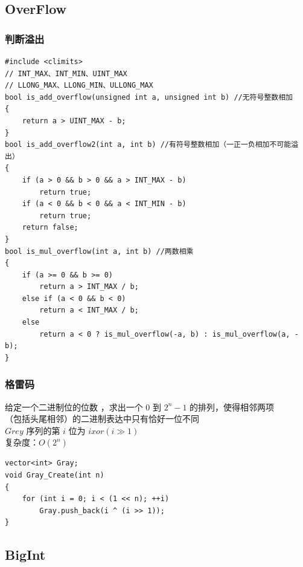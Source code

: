 \documentclass[twoside]{article}
\begin{document}
\subsection{OverFlow}
\subsubsection{判断溢出}
\begin{lstlisting}
#include <climits>
// INT_MAX、INT_MIN、UINT_MAX
// LLONG_MAX、LLONG_MIN、ULLONG_MAX
bool is_add_overflow(unsigned int a, unsigned int b) //无符号整数相加
{
    return a > UINT_MAX - b;
}
bool is_add_overflow2(int a, int b) //有符号整数相加（一正一负相加不可能溢出）
{
    if (a > 0 && b > 0 && a > INT_MAX - b)
        return true;
    if (a < 0 && b < 0 && a < INT_MIN - b)
        return true;
    return false;
}
bool is_mul_overflow(int a, int b) //两数相乘
{
    if (a >= 0 && b >= 0)
        return a > INT_MAX / b;
    else if (a < 0 && b < 0)
        return a < INT_MAX / b;
    else
        return a < 0 ? is_mul_overflow(-a, b) : is_mul_overflow(a, -b);
}
\end{lstlisting}
\subsubsection{格雷码}
给定一个二进制位的位数 ，求出一个 $0$ 到 $2^n - 1$ 的排列，使得相邻两项 \\
（包括头尾相邻）的二进制表达中只有恰好一位不同 \\
$Grey$ 序列的第 $i$ 位为 $i xor (i \gg 1)$ \\
复杂度：$O(2^n)$
\begin{lstlisting}
vector<int> Gray;
void Gray_Create(int n)
{
    for (int i = 0; i < (1 << n); ++i)
        Gray.push_back(i ^ (i >> 1));
}
\end{lstlisting}
\subsection{BigInt}
\end{document}

